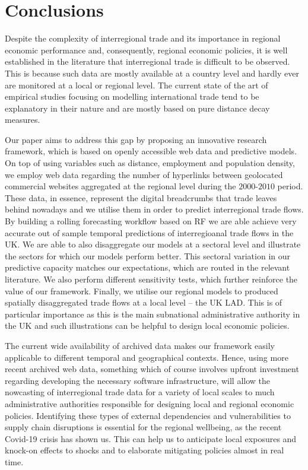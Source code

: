 \documentclass[]{interact}
\theoremstyle{plain}%
\theoremstyle{definition}
\theoremstyle{remark}
\begin{document}
\hypertarget{sec:6}{%
\section{Conclusions}\label{sec:6}}

Despite the complexity of interregional trade and its importance in
regional economic performance and, consequently, regional economic
policies, it is well established in the literature that interregional
trade is difficult to be observed. This is because such data are mostly
available at a country level and hardly ever are monitored at a local or
regional level. The current state of the art of empirical studies
focusing on modelling international trade tend to be explanatory in
their nature and are mostly based on pure distance decay measures.

Our paper aims to address this gap by proposing an innovative research
framework, which is based on openly accessible web data and predictive
models. On top of using variables such as distance, employment and
population density, we employ web data regarding the number of
hyperlinks between geolocated commercial websites aggregated at the
regional level during the \(2000\)-\(2010\) period. These data, in
essence, represent the digital breadcrumbs that trade leaves behind
nowadays and we utilise them in order to predict interregional trade
flows. By building a rolling forecasting workflow based on RF we are
able achieve very accurate out of sample temporal predictions of
interregioanal trade flows in the UK. We are able to also disaggregate
our models at a sectoral level and illustrate the sectors for which our
models perform better. This sectoral variation in our predictive
capacity matches our expectations, which are routed in the relevant
literature. We also perform different sensitivity tests, which further
reinforce the value of our framework. Finally, we utilise our regional
models to produced spatially disaggregated trade flows at a local level
-- the UK LAD. This is of particular importance as this is the main
subnational administrative authority in the UK and such illustrations
can be helpful to design local economic policies.

The current wide availability of archived data makes our framework
easily applicable to different temporal and geographical contexts.
Hence, using more recent archived web data, something which of course
involves upfront investment regarding developing the necessary software
infrastructure, will allow the nowcasting of interregional trade data
for a variety of local scales to much administrative authorities
responsible for designing local and regional economic policies.
Identifying these types of external dependencies and vulnerabilities to
supply chain disruptions is essential for the regional wellbeing, as the
recent Covid-19 crisis has shown us. This can help us to anticipate
local exposures and knock-on effects to shocks and to elaborate
mitigating policies almost in real time.



\end{document}
